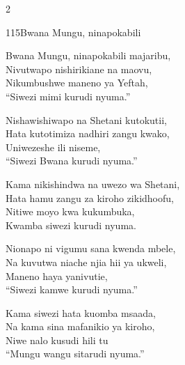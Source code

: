 \documentclass{article}
\begin{document}
\begin{multicols}{2}
\begin{hymn}{115}{Bwana Mungu, ninapokabili}{}
\begin{stanza}
Bwana Mungu, ninapokabili majaribu,\\
Nivutwapo nishirikiane na maovu,\\
Nikumbushwe maneno ya Yeftah,\\
``Siwezi mimi kurudi nyuma.''
\end{stanza}
\begin{stanza}
Nishawishiwapo na Shetani kutokutii,\\
Hata kutotimiza nadhiri zangu kwako,\\
Uniwezeshe ili niseme,\\
``Siwezi Bwana kurudi nyuma.''
\end{stanza}
\begin{stanza}
Kama nikishindwa na uwezo wa Shetani,\\
Hata hamu zangu za kiroho zikidhoofu,\\
Nitiwe moyo kwa kukumbuka,\\
Kwamba siwezi kurudi nyuma.
\end{stanza}
\begin{stanza}
Nionapo ni vigumu sana kwenda mbele,\\
Na kuvutwa niache njia hii ya ukweli,\\
Maneno haya yanivutie,\\
``Siwezi kamwe kurudi nyuma.''
\end{stanza}
\begin{stanza}
Kama siwezi hata kuomba msaada,\\
Na kama sina mafanikio ya kiroho,\\
Niwe nalo kusudi hili tu\\
``Mungu wangu sitarudi nyuma.''
\end{stanza}
\end{hymn}


\end{multicols}
\end{document}
